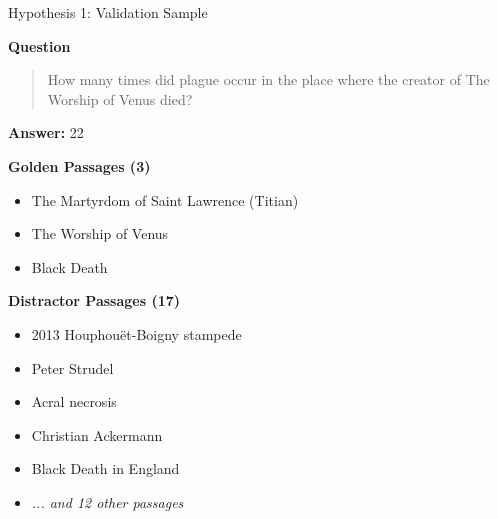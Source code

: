 \begin{frame}{Hypothesis 1: Validation Sample}

\textbf{Question}
\begin{quote}
How many times did plague occur in the place where the creator of The Worship of Venus died?
\end{quote}

\textbf{Answer:} 22

\vspace{0.2cm}

\textbf{Golden Passages (3)}
\begin{itemize}
    \item The Martyrdom of Saint Lawrence (Titian)
    \item The Worship of Venus
    \item Black Death
\end{itemize}

\textbf{Distractor Passages (17)}
\begin{itemize}
    \item 2013 Houphouët-Boigny stampede
    \item Peter Strudel
    \item Acral necrosis
    \item Christian Ackermann
    \item Black Death in England
    \item \textit{... and 12 other passages}
\end{itemize}

\end{frame}
